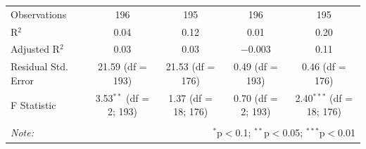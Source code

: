 \documentclass[]{article}
\begin{document}
\begin{table}[!htbp]
\begin{tabular}{@{\extracolsep{5pt}}lcccc}
Observations & 196 & 195 & 196 & 195 \\ 
R$^{2}$ & 0.04 & 0.12 & 0.01 & 0.20 \\ 
Adjusted R$^{2}$ & 0.03 & 0.03 & $-$0.003 & 0.11 \\ 
Residual Std. Error & 21.59 (df = 193) & 21.53 (df = 176) & 0.49 (df = 193) & 0.46 (df = 176) \\ 
F Statistic & 3.53$^{**}$ (df = 2; 193) & 1.37 (df = 18; 176) & 0.70 (df = 2; 193) & 2.40$^{***}$ (df = 18; 176) \\ 
\hline 
\hline \\[-1.8ex] 
\textit{Note:}  & \multicolumn{4}{r}{$^{*}$p$<$0.1; $^{**}$p$<$0.05; $^{***}$p$<$0.01} \\ 
\end{tabular} 
\end{table}
\end{document}
